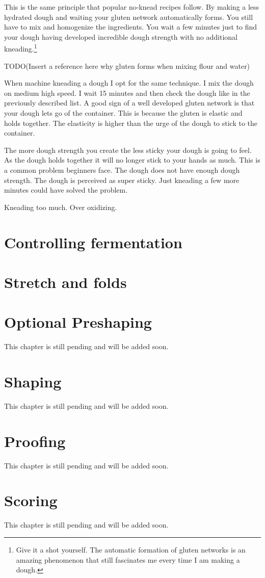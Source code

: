 This is the same principle that popular no-knead recipes follow. By making a less
hydrated dough and waiting your gluten network automatically forms. You still
have to mix and homogenize the ingredients. You wait a few minutes just to
find your dough having developed incredible dough strength with no additional
kneading.\footnote{Give it a shot yourself. The automatic formation of gluten
networks is an amazing phenomenon that still fascinates me every time I am
making a dough.}


TODO(Insert a reference here why gluten forms when mixing flour and water)

When machine kneading a dough I opt for the same technique. I mix the dough on
medium high speed. I wait 15 minutes and then check the dough like in the
previously described list. A good sign of a well developed gluten network is
that your dough lets go of the container. This is because the gluten is
elastic and holds together. The elasticity is higher than the urge of the
dough to stick to the container.

The more dough strength you create the less sticky your dough is going to
feel. As the dough holds together it will no longer stick to your hands as
much. This is a common problem beginners face. The dough does not have enough
dough strength. The dough is perceived as super sticky. Just kneading a few
more minutes could have solved the problem.


Kneading too much.
Over oxidizing.

\section{Controlling fermentation}
\section{Stretch and folds}
\section{Optional Preshaping}
This chapter is still pending and will be added soon.

\section{Shaping}
This chapter is still pending and will be added soon.

\section{Proofing}
This chapter is still pending and will be added soon.

\section{Scoring}
This chapter is still pending and will be added soon.
